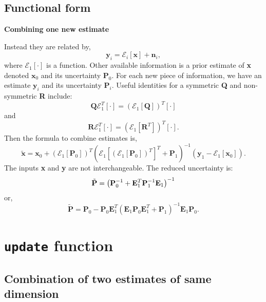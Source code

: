 \documentclass{article}
\begin{document}
\subsection{Functional form}
\label{sec:functional-form}

\textbf{{Combining one new estimate}}

 Instead they are related by,
\begin{equation}
\label{eq:17}
\mathbf{y}_i = \mathcal{E}_i[ \mathbf{x}] + \mathbf{n}_i,
\end{equation}
where $\mathcal{E}_1[\cdot]$ is a function. Other available information is a prior
estimate of \textbf{x} denoted $\mathbf{x}_0$ and its uncertainty
$\mathbf{P}_{0}$. For each new piece of information, we have an
estimate $\mathbf{y}_i$ and its uncertainty $\mathbf{P}_{i}$. Useful
identities for a symmetric \textbf{Q} and non-symmetric \textbf{R}
include:
\begin{equation}
\label{eq:21}
\mathbf{Q} \mathcal{E}^T_1[\cdot] = \left( \mathcal{E}_1[\mathbf{Q}] \right)^T [\cdot]
\end{equation}
and
\begin{equation}
\label{eq:21}
\mathbf{R} \mathcal{E}^T_1[\cdot] = \left( \mathcal{E}_1[\mathbf{R}^T] \right)^T [\cdot].
\end{equation}
Then the formula to combine estimates is,
\begin{equation}
\tilde{\mathbf{x}} = \mathbf{x}_0 + \left( \mathcal{E}_1[\mathbf{P}_0] \right)^T ( \mathcal{E}_{1}[(\mathcal{E}_1[\mathbf{P}_0])^T]^{T} + \mathbf{P}_1 )^{-1} (\mathbf{y}_1 - \mathcal{E}_1[\mathbf{x}_0]) .
\end{equation}
The inputs \textbf{x} and \textbf{y} are not interchangeable. The reduced uncertainty is:
\begin{equation}
 \tilde{\mathbf{P}}= \left({\bf P}^{-1}_0 + {\bf E}^T_1 {\bf P}_1^{-1} {\bf E}_1 \right)^{-1}
\end{equation}
or,
\begin{equation}
\label{eq:16}
\tilde{\mathbf{P}} = \mathbf{P}_0 - \mathbf{P}_0 \mathbf{E}^T_1 (\mathbf{E}_1 \mathbf{P}_0 \mathbf{E}^T_1 + \mathbf{P}_1 )^{-1} \mathbf{E}_1 \mathbf{P}_0.
\end{equation}

\section{\texttt{update} function}

\subsection{Combination of two estimates of same dimension}
\label{sec:basic-form}
\end{document}
